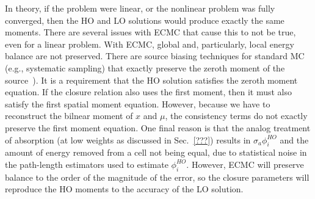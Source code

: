In theory, if the problem were linear, or the nonlinear problem was fully converged,
then the HO and LO solutions would produce exactly the same moments.  There are
several issues with ECMC that cause this to not be true, even for a linear problem.
With ECMC, global and, particularly, local energy balance are not preserved.  There
are source biasing techniques for standard MC (e.g., systematic
sampling) that exactly preserve the zeroth moment of the source~\cite{shultis_mc}). 
It is a requirement that the HO solution satisfies the zeroth moment equation. If the
closure relation also uses the first moment, then it must also satisfy the first
spatial moment equation.  However, because we have to reconstruct the bilnear moment
of $x$ and $\mu$, the consistency terms do not exactly preserve the first moment
equation.  One final reason is that the analog treatment of absorption (at low
weights as discussed in Sec.~\ref{???}) results in $\sigma_a \phi^{HO}_i$ and the amount
of energy removed from a cell not being equal, due to statistical noise in the
path-length estimators used to estimate $\phi^{HO}_i$.  However, ECMC will preserve
balance to the order of the magnitude of the error, so the closure parameters will
reproduce the HO moments to the accuracy of the LO solution.
